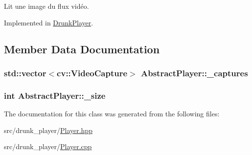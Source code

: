 Lit une image du flux vidéo. 



Implemented in \hyperlink{classDrunkPlayer_a2662f5010e15c95ca6639f56f012aed1}{Drunk\+Player}.



\subsection{Member Data Documentation}
\subsubsection[{\texorpdfstring{\+\_\+captures}{_captures}}]{\setlength{\rightskip}{0pt plus 5cm}std\+::vector$<$cv\+::\+Video\+Capture$>$ Abstract\+Player\+::\+\_\+captures\hspace{0.3cm}{\ttfamily [protected]}}\hypertarget{classAbstractPlayer_a72dd2ef25310decd45671a7d51e1f319}{}\label{classAbstractPlayer_a72dd2ef25310decd45671a7d51e1f319}
\subsubsection[{\texorpdfstring{\+\_\+size}{_size}}]{\setlength{\rightskip}{0pt plus 5cm}int Abstract\+Player\+::\+\_\+size\hspace{0.3cm}{\ttfamily [protected]}}\hypertarget{classAbstractPlayer_a9d8395a141cc985622d4910209bc7d53}{}\label{classAbstractPlayer_a9d8395a141cc985622d4910209bc7d53}


The documentation for this class was generated from the following files\+:\begin{DoxyCompactItemize}
\item 
src/drunk\+\_\+player/\hyperlink{Player_8hpp}{Player.\+hpp}\item 
src/drunk\+\_\+player/\hyperlink{Player_8cpp}{Player.\+cpp}\end{DoxyCompactItemize}
